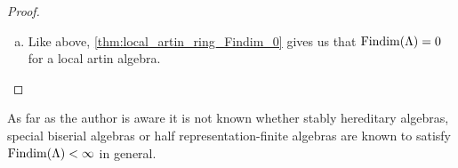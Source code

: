 \begin{theorem}
\begin{proof}
\begin{enumerate}[(a)]
			\item Like above, \cref{thm:local_artin_ring_Findim_0} gives us that $\operatorname{Findim}(\Lambda)=0$ for a local artin algebra.
		\end{enumerate}
	\end{proof}
\end{theorem}

As far as the author is aware it is not known whether stably hereditary algebras, special biserial algebras or half representation-finite algebras are known to satisfy $\operatorname{Findim}(\Lambda) < \infty$ in general.



